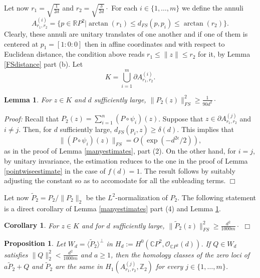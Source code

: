 \documentclass [11pt]{amsart}
\newtheorem {lemma}[theorem]{Lemma}
\newtheorem {proposition}[theorem]{Proposition}
\newtheorem {corollary}[theorem]{Corollary}
\theoremstyle{remark}
\numberwithin{equation}{section}
\numberwithin{theorem}{section}
\begin{document}
Let now $\displaystyle{r_{1}=\sqrt{\frac{1}{2d}}}$ and $\displaystyle{r_{2}=\sqrt{\frac{3}{2d}}\cdot}$ For each $i\in\{1,\ldots,m\}$ we define the annuli 
\begin{equation} 
A^{(i)}_{r_{1},r_{2}}= \{ p\in \mathbb{R}P^2 |  \arctan(r_{1})\leq d_{FS}(p,p_{i})\leq \arctan(r_{2})\}.
\end{equation} 
Clearly, these annuli are unitary translates of one another and if one of them is centered at $p_{1}=[1:0:0]$ then in affine coordinates and with respect to Euclidean distance, the condition above reads $r_{1}\leq \|z\| \leq r_{2}$ for it, by Lemma \ref{FSdistance} part (b). Let 
\begin{equation} \label{Kforglobal}
 K=\bigcup_{i=1}^{m} \partial A^{(i)}_{r_{1},r_{2}}. 
 \end{equation}

\begin{lemma} \label{P2sup}
For $z\in K$ and $d$ sufficiently large, $\displaystyle{\|P_{2}(z)\|_{FS}^2\geq \frac{1}{90 d^2}}\cdot $ 
\end{lemma} 

\noindent \textit{Proof:} Recall that $\displaystyle{P_{2}(z)=\sum_{i=1}^{n} (P\circ \psi_{i})(z)}$. Suppose that $z\in \partial A^{(j)}_{r_{1},r_{2}}$ and $i\neq j$. Then, for $d$ sufficiently large, $d_{FS}(p_{i},z)\geq \delta(d)$. This implies that 
\[ \|(P\circ \psi_{i})(z)\|_{FS}=O\left(\exp\left(-d^{2\epsilon}/2\right)\right),\]
as in the proof of Lemma \ref{manyestimates}, part (2). On the other hand, for $i=j$, by unitary invariance, the estimation reduces to the one 
in the proof of Lemma \ref{pointwiseestimate} in the case of $f(d)=1$. The result follows by suitably adjusting the constant so as to accomodate for all the subleading terms. \hfill $\Box$

Let now $\widetilde{P}_{2}=P_{2}/\|P_{2}\|_{2}$ be the $L^2$-normalization of $P_{2}$. The following statement is a direct corollary of Lemma \ref{manyestimates} part (4) and Lemma \ref{P2sup}. 

\begin{corollary} \label{P2lowerbound}
For $z\in K$ and for $d$ sufficiently large, $\displaystyle{ \|\widetilde{P}_{2}(z)\|_{FS}^2\geq \frac{d^2}{1000m}\cdot}$
\hfill $\Box$
\end{corollary} 

\begin{proposition} \label{globalhomotopy}
Let $W_{d}=\langle \widetilde{P}_{2}\rangle^{\perp}$ in $H_d:=H^0(\mathbb{C}P^2,\mathcal{O}_{\mathbb{C}P^2}(d))$. If $Q\in W_{d}$ satisfies $\displaystyle{\|Q\|_{2}^2<\frac{d^2}{1000m}}$ and $a\geq1$, then the homology classes of the zero loci of $a\widetilde{P}_{2}+Q$ and $\widetilde{P}_{2}$ are the same in $H_{1}(A^{(j)}_{r_{1},r_{2}},\mathbb{Z}_{2})$ for every $j\in \{1,\ldots,m\}$. 
\end{proposition} 
\end{document}

